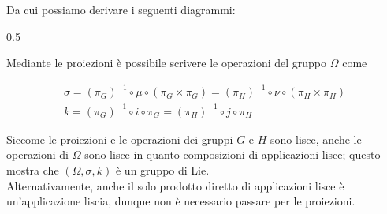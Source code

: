 {Da cui possiamo derivare i seguenti diagrammi:

	{0.5}{%
			}

Mediante le proiezioni è possibile scrivere le operazioni del gruppo $ \Omega $ come

\begin{gather}
	\sigma = (\pi_{G})^{-1} \circ \mu \circ (\pi_{G} \times \pi_{G}) %
	= (\pi_{H})^{-1} \circ \nu \circ (\pi_{H} \times \pi_{H}) \\
	k = (\pi_{G})^{-1} \circ i \circ \pi_{G} %
	= (\pi_{H})^{-1} \circ j \circ \pi_{H}
\end{gather}

Siccome le proiezioni e le operazioni dei gruppi $ G $ e $ H $ sono lisce, anche le operazioni di $ \Omega $ sono lisce in quanto composizioni di applicazioni lisce; questo mostra che $ (\Omega, \sigma, k) $ è un gruppo di Lie.\\
Alternativamente, anche il solo prodotto diretto di applicazioni lisce è un'applicazione liscia, dunque non è necessario passare per le proiezioni.
}

